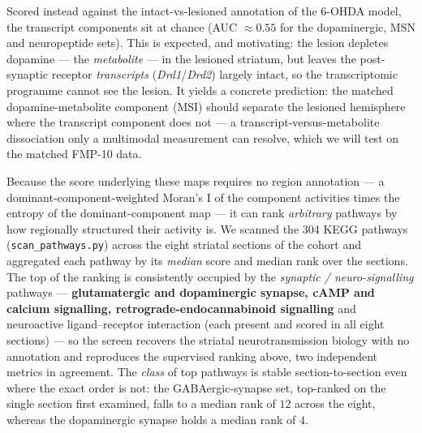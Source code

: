 \documentclass[11pt]{article}
\newcommand{\code}[1]{\texttt{#1}}
\begin{document}
Scored instead against the intact-vs-lesioned annotation of the 6-OHDA model, the transcript
components sit at chance (AUC $\approx 0.55$ for the dopaminergic, MSN and neuropeptide sets).
This is expected, and motivating: the lesion depletes dopamine --- the \emph{metabolite} ---
in the lesioned striatum, but leaves the post-synaptic receptor \emph{transcripts}
(\textit{Drd1}/\textit{Drd2}) largely intact, so the transcriptomic programme cannot see the
lesion. It yields a concrete prediction: the matched dopamine-metabolite component (MSI) should
separate the lesioned hemisphere where the transcript component does not --- a
transcript-versus-metabolite dissociation only a multimodal measurement can resolve, which we
will test on the matched FMP-10 data.

Because the score underlying these maps requires no region annotation --- a
dominant-component-weighted Moran's I of the component activities times the entropy of the
dominant-component map --- it can rank \emph{arbitrary} pathways by how regionally structured
their activity is. We scanned the 304 KEGG pathways (\code{scan\_pathways.py}) across the eight
striatal sections of the cohort and aggregated each pathway by its \emph{median} score and
median rank over the sections. The top of the ranking is consistently occupied by the
\emph{synaptic / neuro-signalling} pathways --- \textbf{glutamatergic and dopaminergic synapse,
cAMP and calcium signalling, retrograde-endocannabinoid signalling} and neuroactive
ligand--receptor interaction (each present and scored in all eight sections) --- so the screen
recovers the striatal neurotransmission biology with no annotation and reproduces the supervised
ranking above, two independent metrics in agreement. The \emph{class} of top pathways is stable
section-to-section even where the exact order is not: the GABAergic-synapse set, top-ranked on
the single section first examined, falls to a median rank of $12$ across the eight, whereas the
dopaminergic synapse holds a median rank of $4$.
\end{document}
